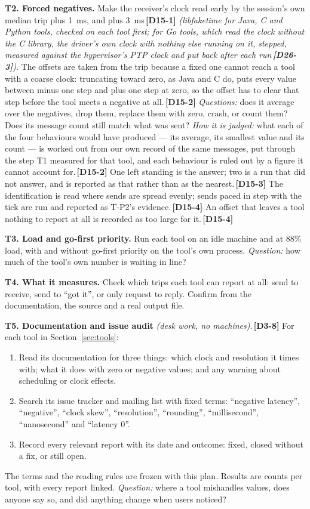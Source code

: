 \documentclass[11pt]{article}
\newcommand{\gl}[1]{{\color{soft}\itshape\small (#1)}}
\newcommand{\chgold}[1]{\,{\color{oldcol}\bfseries\footnotesize[#1]}}
\begin{document}
\textbf{T2. Forced negatives.} Make the receiver's clock read early by the session's own median trip plus 1~ms, and plus 3~ms\chgold{D15-1} \gl{libfaketime for Java, C and Python tools, checked on each tool first; for Go tools, which read the clock without the C library, the driver's own clock with nothing else running on it, stepped, measured against the hypervisor's PTP clock and put back after each run\chgold{D26-3}}. The offsets are taken from the trip because a fixed one cannot reach a tool with a coarse clock: truncating toward zero, as Java and C do, puts every value between minus one step and plus one step at zero, so the offset has to clear that step before the tool meets a negative at all.\chgold{D15-2} \emph{Questions:} does it average over the negatives, drop them, replace them with zero, crash, or count them? Does its message count still match what was sent? \emph{How it is judged:} what each of the four behaviours would have produced --- its average, its smallest value and its count --- is worked out from our own record of the same messages, put through the step T1 measured for that tool, and each behaviour is ruled out by a figure it cannot account for.\chgold{D15-2} One left standing is the answer; two is a run that did not answer, and is reported as that rather than as the nearest.\chgold{D15-3} The identification is read where sends are spread evenly; sends paced in step with the tick are run and reported as T-P2's evidence.\chgold{D15-4} An offset that leaves a tool nothing to report at all is recorded as too large for it.\chgold{D15-4}

\textbf{T3. Load and go-first priority.} Run each tool on an idle machine and at 88\% load, with and without go-first priority on the tool's own process. \emph{Question:} how much of the tool's own number is waiting in line?

\textbf{T4. What it measures.} Check which trips each tool can report at all: send to receive, send to ``got it'', or only request to reply. Confirm from the documentation, the source and a real output file.

\textbf{T5. Documentation and issue audit} \gl{desk work, no machines}.\chgold{D3-8} For each tool in Section~\ref{sec:tools}:
\begin{enumerate}
  \item Read its documentation for three things: which clock and resolution it times with; what it does with zero or negative values; and any warning about scheduling or clock effects.
  \item Search its issue tracker and mailing list with fixed terms: ``negative latency'', ``negative'', ``clock skew'', ``resolution'', ``rounding'', ``millisecond'', ``nanosecond'' and ``latency 0''.
  \item Record every relevant report with its date and outcome: fixed, closed without a fix, or still open.
\end{enumerate}
The terms and the reading rules are frozen with this plan. Results are counts per tool, with every report linked. \emph{Question:} where a tool mishandles values, does anyone say so, and did anything change when users noticed?
\end{document}
